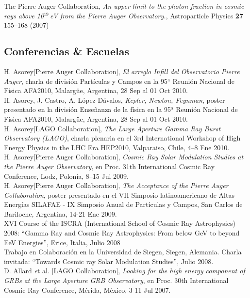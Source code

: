 \documentclass[11pt, a4paper]{article}
\newcommand{\years}[1]{\marginnote{\scriptsize #1}}
\begin{document}
\years{2007}The Pierre Auger Collaboration, {\emph{An upper limit to the photon
fraction in cosmic rays above 10$^{19}$\,eV from the Pierre Auger
Observatory.}}, Astroparticle Physics {\bf 27} 155--168 (2007)\\

\subsection*{Conferencias \& Escuelas}
\noindent
\years{2010}H. Asorey[Pierre Auger Collaboration], {\emph{El arreglo Infill del
Observatorio Pierre Auger}}, charla de división Partículas y Campos en la
95$^\mathrm{a}$ Reunión Nacional de Física AFA2010, Malargüe, Argentina, 28 Sep
al 01 Oct 2010.\\
\years{2010}H. Asorey, J. Castro, A. López Dávalos, {\emph{Kepler, Newton,
Feynman}}, poster presentado en la división Enseñanza de la física en la
95$^\mathrm{a}$ Reunión Nacional de Física AFA2010, Malargüe, Argentina, 28 Sep
al 01 Oct 2010.\\
\years{2010}H. Asorey[LAGO Collaboration], {\emph{The Large Aperture Gamma Ray
Burst Observatory (LAGO)}}, charla plenaria en el 3rd International Workshop of
High Energy Physics in the LHC Era HEP2010, Valparaiso, Chile, 4--8 Ene 2010.\\
\years{2009}H. Asorey[Pierre Auger Collaboration], {\emph{Cosmic Ray Solar
Modulation Studies at the Pierre Auger Observatory}}, en Proc. 31th
International Cosmic Ray Conference, Lodz, Polonia, 8--15 Jul 2009.\\
\years{2009}H. Asorey[Pierre Auger Collaboration], {\emph{The Acceptance of the
Pierre Auger Collaboration}}, poster presentado en el VII Simposio
latinoamericano de Altas Energías SILAFAE - IX Simposio Anual de Partículas y
Campos, San Carlos de Bariloche, Argentina, 14-21 Ene 2009.\\
\years{2008}XVI Course of the ISCRA (International School of Cosmic Ray
Astrophysics) 2008: “Gamma Ray and Cosmic Ray Astrophysics: From below GeV to
beyond EeV Energies”, Erice, Italia, Julio 2008\\
\years{2008}Trabajo en Colaboración en la Universidad de Siegen, Siegen,
Alemania. Charla invitada: “Towards Cosmic ray Solar Modulation Studies”, Julio
2008.\\
\years{2007}D. Allard {\emph et al.} [LAGO Collaboration], {\emph{Looking for the high energy
component of GRBs at the Large Aperture GRB Observatory}}, en Proc. 30th
International Cosmic Ray Conference,  Mérida, México, 3-11 Jul 2007.\\
\end{document}
